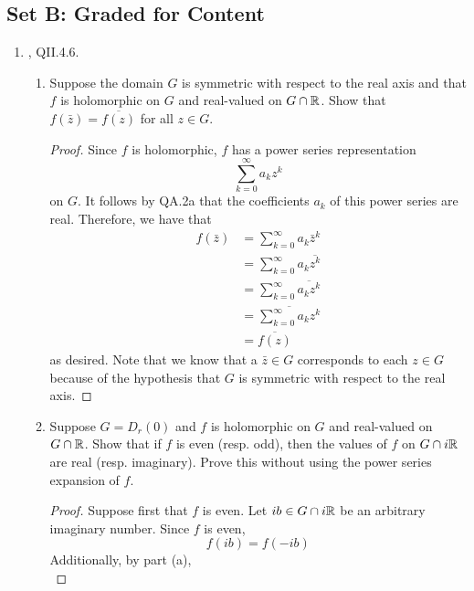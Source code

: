 \documentclass[../psets.tex]{subfiles}
\begin{document}
\subsection*{Set B: Graded for Content}
\begin{enumerate}[label={\textbf{\arabic*.}}]
    \item \textcite{bib:FischerLieb}, QII.4.6.
    \begin{enumerate}
        \item Suppose the domain $G$ is symmetric with respect to the real axis and that $f$ is holomorphic on $G$ and real-valued on $G\cap\mathbb{R}$. Show that $f(\bar{z})=\overline{f(z)}$ for all $z\in G$.
        \begin{proof}
            Since $f$ is holomorphic, $f$ has a power series representation
            \begin{equation*}
                \sum_{k=0}^\infty a_kz^k
            \end{equation*}
            on $G$. It follows by QA.2a that the coefficients $a_k$ of this power series are real. Therefore, we have that
            \begin{align*}
                f(\bar{z}) &= \sum_{k=0}^\infty a_k\bar{z}^k\\
                &= \sum_{k=0}^\infty a_k\overline{z^k}\\
                &= \sum_{k=0}^\infty\overline{a_kz^k}\\
                &= \overline{\sum_{k=0}^\infty a_kz^k}\\
                &= \overline{f(z)}
            \end{align*}
            as desired. Note that we know that a $\bar{z}\in G$ corresponds to each $z\in G$ because of the hypothesis that $G$ is symmetric with respect to the real axis.
        \end{proof}
        \item Suppose $G=D_r(0)$ and $f$ is holomorphic on $G$ and real-valued on $G\cap\mathbb{R}$. Show that if $f$ is even (resp. odd), then the values of $f$ on $G\cap i\mathbb{R}$ are real (resp. imaginary). Prove this without using the power series expansion of $f$.
        \begin{proof}
            Suppose first that $f$ is even. Let $ib\in G\cap i\mathbb{R}$ be an arbitrary imaginary number. Since $f$ is even,
            \begin{equation*}
                f(ib) = f(-ib)
            \end{equation*}
            Additionally, by part (a),
            \begin{equation*}

\end{equation*}
\end{proof}
\end{enumerate}
\end{enumerate}
\end{document}
